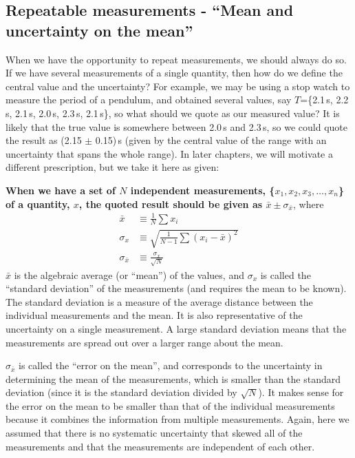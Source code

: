 \subsection{Repeatable measurements - ``Mean and uncertainty on the mean''}
When we have the opportunity to repeat measurements, we should always do so. If we have several measurements of a single quantity, then how do we define the central value and the uncertainty? For example, we may be using a stop watch to measure the period of a pendulum, and obtained several values, say $T$=\{2.1\,s, 2.2\,s, 2.1\,s, 2.0\,s, 2.3\,s, 2.1\,s\}, so what should we quote as our measured value? It is likely that the true value is somewhere between 2.0\,s and 2.3\,s, so we could quote the result as (2.15 $\pm$ 0.15)\,s (given by the central value of the range with an uncertainty that spans the whole range). In later chapters, we will motivate a different prescription, but we take it here as given:

\textbf{When we have a set of $N$ independent measurements, \{$x_1, x_2, x_3, \dots, x_n$\} of a quantity, $x$, the quoted result should be given as $\bar x \pm \sigma_{\bar x}$}, where
\begin{align}
\label{eqn:MeanAndStd}
\bar x &\equiv \frac{1}{N}\sum x_i \nonumber\\
\sigma_x &\equiv \sqrt{\frac{1}{N-1}\sum (x_i-\bar x)^2}\nonumber\\
\sigma_{\bar x} &\equiv \frac{\sigma_x}{\sqrt{N}}
\end{align}
$\bar x$ is the algebraic average (or ``mean'') of the values, and $\sigma_x$ is called the ``standard deviation'' of the measurements (and requires the mean to be known). The standard deviation is a measure of the average distance between the individual measurements and the mean. It is also representative of the uncertainty on a single measurement. A large standard deviation means that the measurements are spread out over a larger range about the mean.

$\sigma_{\bar x}$ is called the ``error on the mean'', and corresponds to the uncertainty in determining the mean of the measurements, which is smaller than the standard deviation (since it is the standard deviation divided by $\sqrt{N}$). It makes sense for the error on the mean to be smaller than that of the individual measurements because it combines the information from multiple measurements. Again, here we assumed that there is no systematic uncertainty that skewed all of the measurements and that the measurements are independent of each other.

